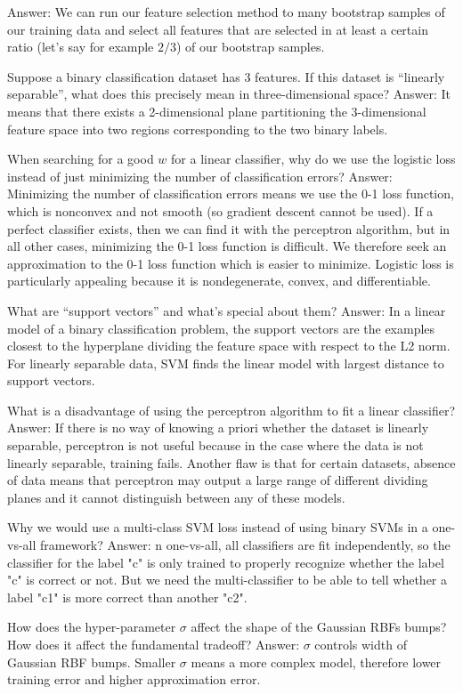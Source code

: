 \documentclass{article}
\def\gre#1{{\color{gre}#1}}
\def\ans#1{\gre{Answer: #1}}{}
\begin{document}
{\ans{We can run our feature selection method to many bootstrap samples of our training data and select all features that are selected in at least a certain ratio (let's say for example $2/3$) of our bootstrap samples.}
\item Suppose a binary classification dataset has 3 features. If this dataset is ``linearly separable'', what does this precisely mean in three-dimensional space?
\ans{It means that there exists a 2-dimensional plane partitioning the 3-dimensional feature space into two regions corresponding to the two binary labels.}
\item When searching for a good $w$ for a linear classifier, why do we use the logistic loss instead of just minimizing the number of classification errors?
\ans{Minimizing the number of classification errors means we use the 0-1 loss function, which is nonconvex and not smooth (so gradient descent cannot be used). If a perfect classifier exists, then we can find it with the perceptron algorithm, but in all other cases, minimizing the 0-1 loss function is difficult. We therefore seek an approximation to the 0-1 loss function which is easier to minimize. Logistic loss is particularly appealing because it is nondegenerate, convex, and differentiable.}
\item What are ``support vectors'' and what's special about them?
\ans{In a linear model of a binary classification problem, the support vectors are the examples closest to the hyperplane dividing the feature space with respect to the L2 norm. For linearly separable data, SVM finds the linear model with largest distance to support vectors.}
\item What is a disadvantage of using the perceptron algorithm to fit a linear classifier?
\ans{ If there is no way of knowing a priori whether the dataset is linearly separable, perceptron is not useful because in the case where the data is not linearly separable, training fails. Another flaw is that for certain datasets, absence of data means that perceptron may output a large range of different dividing planes and it cannot distinguish between any of these models.}
\item Why we would use a multi-class SVM loss instead of using binary SVMs in a one-vs-all framework?
\ans{n one-vs-all, all classifiers are fit independently, so the classifier for the label "c" is only trained to properly recognize whether the label "c" is correct or not. But we need the multi-classifier to be able to tell whether a label "c1" is more correct than another "c2".}
\item How does the hyper-parameter $\sigma$ affect the shape of the Gaussian RBFs bumps? How does it affect the fundamental tradeoff?
\ans{$\sigma$ controls width of Gaussian RBF bumps. Smaller $\sigma$ means a more complex model, therefore lower training error and higher approximation error.}
}
\end{document}

